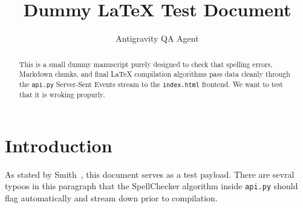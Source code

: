 \documentclass{article}
\begin{document}
\title{Dummy LaTeX Test Document}
\author{Antigravity QA Agent}
\maketitle

\begin{abstract}
This is a small dummy manuscript purely designed to check that spelling errors, Markdown chunks, and final LaTeX compilation algorithms pass data cleanly through the \texttt{api.py} Server-Sent Events stream to the \texttt{index.html} frontend. We want to test that it is wroking propurly.
\end{abstract}

\section{Introduction}
As stated by Smith~\cite{smith2023}, this document serves as a test payload. There are sevral typoos in this paragraph that the SpellChecker algorithm inside \texttt{api.py} should flag automatically and stream down prior to compilation.
\end{document}
